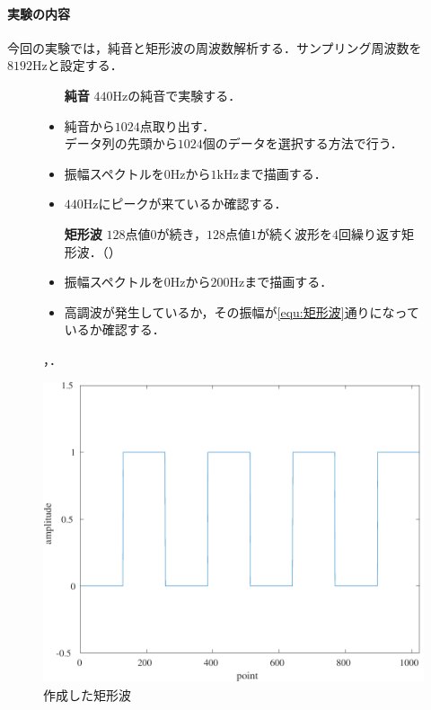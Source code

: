 \paragraph{実験の内容}今回の実験では，純音と矩形波の周波数解析する．サンプリング周波数を\(8192\textrm{Hz}\)と設定する．
\begin{figure}[H]
    \begin{minipage}[c]{.55\textwidth}
        \begin{itemize}
            \item[\textbf{純音}] \(440\textrm{Hz}\)の純音で実験する．
            \item 純音から\(1024\)点取り出す．\\
                  データ列の先頭から\(1024\)個のデータを選択する方法で行う．
            \item 振幅スペクトルを\(0\textrm{Hz}\)から\(1\textrm{kHz}\)まで描画する．
            \item \(440\textrm{Hz}\)にピークが来ているか確認する．
            \item[\textbf{矩形波}] \(128\)点値\(0\)が続き，\(128\)点値\(1\)が続く波形を\(4\)回繰り返す矩形波．（）
            \item 振幅スペクトルを\(0\textrm{Hz}\)から\(200\textrm{Hz}\)まで描画する．
            \item 高調波が発生しているか，その振幅が\eqref{equ:矩形波}通りになっているか確認する．
        \end{itemize}
        \scall{}，．
    \end{minipage}
    \begin{minipage}[c]{.4\textwidth}
        \centering
        \includegraphics[keepaspectratio,width=\textwidth]{../../Figures/02_021.pdf}
        \caption{作成した矩形波}
        \label{fig:作成した矩形波}
    \end{minipage}
\end{figure}
